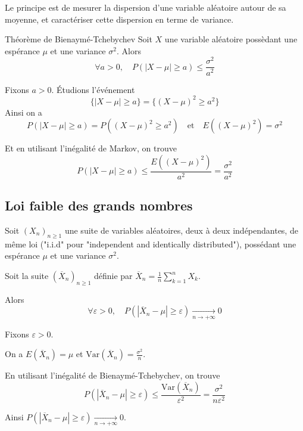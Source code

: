 \documentclass[a4paper,12pt]{article}
\begin{document}
Le principe est de
mesurer la dispersion d'une variable aléatoire autour de sa moyenne, et caractériser cette dispersion en terme de variance.

\begin{theoreme}{Théorème de Bienaymé-Tchebychev}{}
    Soit $X$ une variable aléatoire possèdant une espérance $\mu$ et une variance $\sigma^2$. Alors
    $$
    \forall a > 0, \quad P(|X - \mu| \geq a) \leq \frac{\sigma^2}{a^2}
    $$
\end{theoreme}

\begin{demonstration}
    Fixons $a > 0$.
    Étudions l'événement
    $$
    \{|X - \mu| \geq a\} = \{(X - \mu)^2 \geq a^2\}
    $$
    Ainsi on a
    $$
    P(|X - \mu| \geq a) = P((X - \mu)^2 \geq a^2) \quad \text{et} \quad E((X - \mu)^2) = \sigma^2
    $$

    Et en utilisant l'inégalité de Markov, on trouve
    $$
    P(|X - \mu| \geq a) \leq \frac{E((X - \mu)^2)}{a^2} = \frac{\sigma^2}{a^2}
    $$
\end{demonstration}

\subsection{Loi faible des grands nombres}

\begin{theoreme}{}{}
    Soit $(X_n)_{n \geq 1}$ une suite de variables aléatoires, deux à deux indépendantes, de même loi ("i.i.d" pour "independent and identically distributed"), possédant une espérance $\mu$ et une variance $\sigma^2$.

    Soit la suite $(\overline{X}_n)_{n \geq 1}$ définie par $\overline{X}_n = \frac{1}{n} \sum_{k=1}^n X_k$.

    Alors
    $$
    \forall \varepsilon > 0, \quad P(|\overline{X}_n - \mu| \geq \varepsilon) \xrightarrow[n \to +\infty]{} 0
    $$
\end{theoreme}

\begin{demonstration}
    Fixons $\varepsilon > 0$.

    On a $E(\overline{X}_n) = \mu$ et $\mathrm{Var}(\overline{X}_n) = \frac{\sigma^2}{n}$.

    En utilisant l'inégalité de Bienaymé-Tchebychev, on trouve
    $$
    P(|\overline{X}_n - \mu| \geq \varepsilon) \leq \frac{\mathrm{Var}(\overline{X}_n)}{\varepsilon^2} = \frac{\sigma^2}{n \varepsilon^2}
    $$

    Ainsi $P(|\overline{X}_n - \mu| \geq \varepsilon) \xrightarrow[n \to +\infty]{} 0$.
\end{demonstration}
\end{document}
